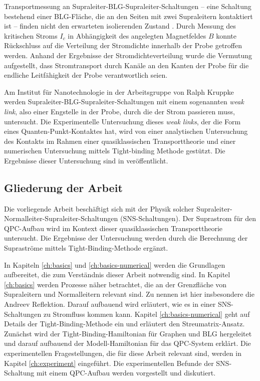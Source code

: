 Transportmessung an Supraleiter-BLG-Supraleiter-Schaltungen -- eine Schaltung bestehend einer BLG-Fl\"ache, die an den Seiten mit zwei Supraleitern kontaktiert ist -- finden nicht den erwarteten isolierenden Zustand \cite{Zhu2017}. Durch Messung des kritischen Stroms $I_c$ in Abh\"angigkeit des angelegten Magnetfeldes $B$ konnte R\"uckschluss auf die Verteilung der Stromdichte innerhalb der Probe getroffen werden. Anhand der Ergebnisse der Stromdichteverteilung wurde die Vermutung aufgestellt, dass Stromtransport durch Kan\"ale an den Kanten der Probe f\"ur die endliche Leitf\"ahigkeit der Probe verantwortlich seien. 

Am Institut f\"ur Nanotechnologie in der Arbeitsgruppe von Ralph Kruppke werden Supraleiter-BLG-Supraleiter-Schaltungen mit einem sogenannten \emph{weak link}, also einer Engstelle in der Probe, durch die der Strom passieren muss, untersucht. Die Experimentelle Untersuchung dieses \emph{weak links}, der die Form eines Quanten-Punkt-Kontaktes hat, wird von einer analytischen Untersuchung des Kontakts im Rahmen einer quasiklassischen Transporttheorie und einer numerischen Untersuchung mittels Tight-binding Methode gest\"utzt. Die Ergebnisse dieser Untersuchung sind in \cite{Kraft2017} ver\"offentlicht. 


\subsection*{Gliederung der Arbeit} 

Die vorliegende Arbeit besch\"aftigt sich mit der Physik solcher Supraleiter-Normalleiter-Supraleiter-Schaltungen (SNS-Schaltungen). Der Suprastrom f\"ur den QPC-Aufbau wird im Kontext dieser quasiklassischen Transporttheorie untersucht. Die Ergebnisse der Untersuchung werden durch die Berechnung der Suprastr\"ome mittels Tight-Binding-Methode erg\"anzt.

In Kapiteln \ref{ch:basics} und  \ref{ch:basics-numerical} werden die Grundlagen aufbereitet, die zum Verst\"andnis dieser Arbeit notwendig sind. In Kapitel \ref{ch:basics} werden Prozesse n\"aher betrachtet, die an der Grenzfl\"ache von Supraleitern und Normalleitern relevant sind. Zu nennen ist hier insbesondere die Andreev Reflektion. Darauf aufbauend wird erl\"autert, wie es in einer SNS-Schaltungen zu Stromfluss kommen kann. Kapitel  \ref{ch:basics-numerical} geht auf Details der Tight-Binding-Methode ein und erl\"autert den Streumatrix-Ansatz. Zun\"achst wird der Tight-Binding-Hamiltonian f\"ur Graphen und BLG hergeleitet und darauf aufbauend der Modell-Hamiltonian f\"ur das QPC-System erkl\"art. Die experimentellen Fragestellungen, die f\"ur diese Arbeit relevant sind, werden in Kapitel \ref{ch:experiment} eingef\"uhrt. Die experimentellen Befunde der SNS-Schaltung mit einem QPC-Aufbau werden vorgestellt und diskutiert.

